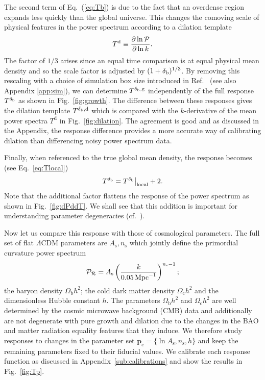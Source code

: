 \documentclass[prd,twocolumn,amsmath,amssymb,floatfix,superscriptaddress]{revtex4-1}
\newcommand{\Omegab}{{\Omega_\textrm{b}}}
\newcommand{\Omegac}{{\Omega_\textrm{c}}}
\newcommand{\As}{{A_\textrm{s}}}
\newcommand{\lnAs}{{\ln\!A_\textrm{s}}}
\newcommand{\ns}{{n_\textrm{s}}}
\newcommand{\br}{{\rm b}}
\newcommand{\Dv}{{\cal P}}
\begin{document}
{{The second term of Eq.~(\ref{eq:Tb}) is due to the fact that an overdense region expands less quickly than the global universe.  This changes the comoving scale of physical features in the
power spectrum according to a dilation template
\begin{equation}
    T^\textrm{d} \equiv \frac{\partial \ln\Dv}{\partial \ln k}.
\label{eq:Td}
\end{equation}
The factor of $1/3$ arises since an equal time comparison is at equal 
{physical}
mean density and so
the scale factor is adjusted by $(1+\delta_\br)^{1/3}$.
By removing this rescaling with a choice of simulation box size introduced in
Ref.~\cite{Lietal:14} (see also Appendix \ref{app:sim}), we can determine $T^{\delta_\br,\textrm{g}}$ independently of
the full response $T^{\delta_\br}$ as shown in Fig.~\ref{fig:growth}.   The difference
between these responses gives the dilation template $T^{\delta_\br,\textrm{d}}$ which is
compared with the $k$-derivative of the mean power spectra $T^\textrm{d}$ in Fig.~\ref{fig:dilation}.  The agreement is good and as discussed in 
the Appendix, the response difference provides a more accurate way of calibrating
dilation than differencing noisy power spectrum data.  


 Finally, when referenced to the true global mean density, the response becomes 
 (see Eq.~\ref{eq:Tlocal})
\begin{equation}
        T^{\delta_\br}  =   T^{\delta_\br} \big|_\textrm{local}  + 2.
        \label{eq:localglobal}
\end{equation}
Note that the additional factor flattens the response of the power spectrum
as shown in Fig.~\ref{fig:dPddT}.  
We shall see that this addition is important for understanding parameter degeneracies
(cf.~\cite{Mohammed:2014lja}).  


Now let us compare this response with those of cosmological parameters. 
 The full
set of flat $\Lambda$CDM parameters are $\As, \ns$ which jointly define the
{primordial}
curvature power spectrum 
\begin{equation}
    {\cal P}_{\cal R} = \As \left( \frac{k}{0.05\,{\rm Mpc}^{-1}} \right)^{\ns-1};
\end{equation}
 the baryon density $\Omegab h^2$; the cold dark matter density
$\Omegac h^2$ and the dimensionless Hubble constant $h$.   The parameters $\Omegab h^2$ and 
$\Omegac h^2$ are well determined by the {cosmic microwave
background (CMB) data}
and additionally are not degenerate with  pure growth and dilation 
due to the changes in the BAO and matter radiation equality features that they induce.
We therefore study responses to changes in the
parameter set $\mathbf{p}_\textrm{c} = \{ \lnAs, \ns, h \}$ and keep the remaining parameters
fixed to their fiducial values.   
We calibrate each response function as discussed in Appendix~\ref{sub:calibrations} 
and show the results in Fig.~\ref{fig:Tp}. 
%




}}
\end{document}
